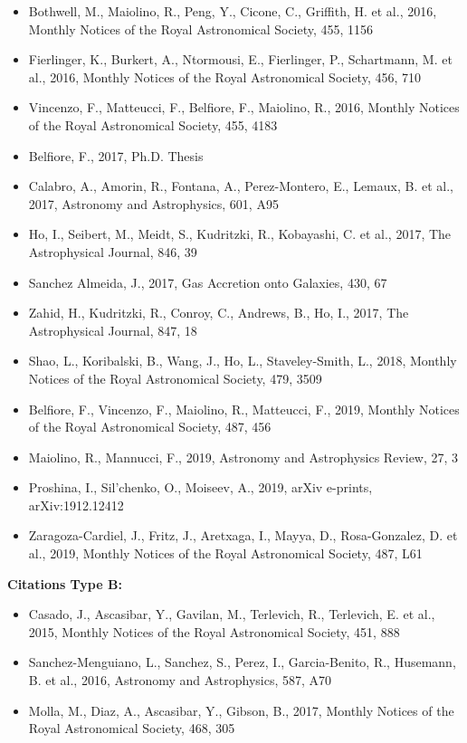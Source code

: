 \documentclass{letter}
\begin{document}
\begin{enumerate}
\begin{itemize}
\item Bothwell, M., Maiolino, R., Peng, Y., Cicone, C., Griffith, H. et al., 2016, Monthly Notices of the Royal Astronomical Society, 455, 1156
\item Fierlinger, K., Burkert, A., Ntormousi, E., Fierlinger, P., Schartmann, M. et al., 2016, Monthly Notices of the Royal Astronomical Society, 456, 710
\item Vincenzo, F., Matteucci, F., Belfiore, F., Maiolino, R., 2016, Monthly Notices of the Royal Astronomical Society, 455, 4183
\item Belfiore, F., 2017, Ph.D. Thesis
\item Calabro, A., Amorin, R., Fontana, A., Perez-Montero, E., Lemaux, B. et al., 2017, Astronomy and Astrophysics, 601, A95
\item Ho, I., Seibert, M., Meidt, S., Kudritzki, R., Kobayashi, C. et al., 2017, The Astrophysical Journal, 846, 39
\item Sanchez Almeida, J., 2017, Gas Accretion onto Galaxies, 430, 67
\item Zahid, H., Kudritzki, R., Conroy, C., Andrews, B., Ho, I., 2017, The Astrophysical Journal, 847, 18
\item Shao, L., Koribalski, B., Wang, J., Ho, L., Staveley-Smith, L., 2018, Monthly Notices of the Royal Astronomical Society, 479, 3509
\item Belfiore, F., Vincenzo, F., Maiolino, R., Matteucci, F., 2019, Monthly Notices of the Royal Astronomical Society, 487, 456
\item Maiolino, R., Mannucci, F., 2019, Astronomy and Astrophysics Review, 27, 3
\item Proshina, I., Sil'chenko, O., Moiseev, A., 2019, arXiv e-prints, arXiv:1912.12412
\item Zaragoza-Cardiel, J., Fritz, J., Aretxaga, I., Mayya, D., Rosa-Gonzalez, D. et al., 2019, Monthly Notices of the Royal Astronomical Society, 487, L61
\end{itemize}
{\bf Citations Type B:}
\begin{itemize}
\item Casado, J., Ascasibar, Y., Gavilan, M., Terlevich, R., Terlevich, E. et al., 2015, Monthly Notices of the Royal Astronomical Society, 451, 888
\item Sanchez-Menguiano, L., Sanchez, S., Perez, I., Garcia-Benito, R., Husemann, B. et al., 2016, Astronomy and Astrophysics, 587, A70
\item Molla, M., Diaz, A., Ascasibar, Y., Gibson, B., 2017, Monthly Notices of the Royal Astronomical Society, 468, 305

\end{itemize}
\end{enumerate}
\end{document}
